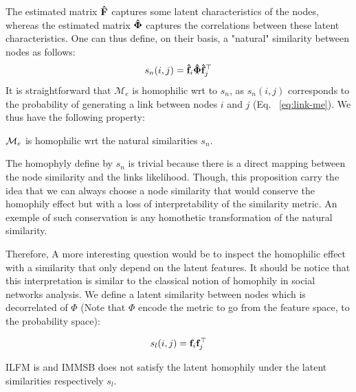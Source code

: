 The estimated matrix $\mathbf{\hat{F}}$ captures some latent characteristics of the nodes, whereas the estimated matrix $\mathbf{\hat{\Phi}}$ captures the correlations between these latent characteristics. One can thus define, on their basis, a "natural" similarity between nodes as follows:
%
\begin{equation}
s_n(i,j) = \mathbf{\hat{f}}_{i} \mathbf{\hat{\Phi}} \mathbf{\hat{f}}_j^\top \nonumber
\end{equation}
%
It is straightforward that $\mathcal{M}_e$ is homophilic wrt to $s_n$, as $s_n(i,j)$ corresponds to the probability of generating a link between nodes $i$ and $j$ (Eq.   ~\ref{eq:link-me}). We thus have the following property:
%
\begin{proposition}[] $\mathcal{M}_e$ is homophilic wrt the natural similarities $s_n$.
\end{proposition}

The homophyly define by $s_n$ is trivial because there is a direct mapping between the node similarity and the links likelihood. Though, this proposition carry the idea that we can always choose a node similarity that would conserve the homophily effect but with a loss of interpretability of the similarity metric. An exemple of such conservation is any homothetic transformation of the natural similarity.

Therefore, A more interesting question would be to inspect the homophilic effect with a similarity that only depend on the latent features. It should be notice that this interpretation is similar to the classical notion of homophily in social networks analysis. We define a latent similarity between nodes which is decorrelated of $\Phi$ (Note that $\Phi$ encode the metric to go from the feature space, to the probability space):

\begin{align}
&s_l(i,j) = \mat{f}_{i} \mat{f}_j^\top \nonumber \\
\label{eq:latent-sim}
\end{align}


\begin{proposition}[]
	ILFM is and IMMSB does not satisfy the latent homophily under the latent similarities respectively $s_l$.
\end{proposition}

